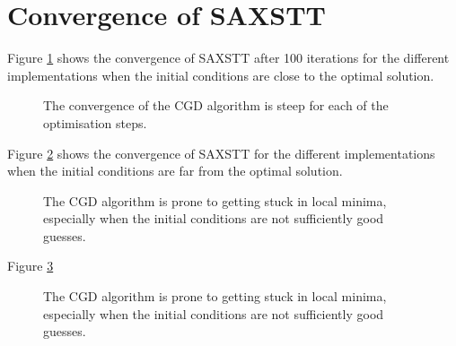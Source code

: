 \section{Convergence of SAXSTT}

Figure \ref{fig:Loss_curve_optimal} shows the convergence of SAXSTT after 100 iterations for the different implementations when the initial conditions are close to the optimal solution. %

\begin{figure}[h!]
    \centering
    \caption{ The convergence of the CGD algorithm is steep for each of the optimisation steps.  }
    \label{fig:Loss_curve_optimal}
\end{figure}

Figure \ref{fig:Loss_curve_worst} shows the convergence of SAXSTT for the different implementations when the initial conditions are far from the optimal solution.

\begin{figure}[h!]
    \centering
    \caption{ The CGD algorithm is prone to getting stuck in local minima, especially when the initial conditions are not sufficiently good guesses.  }
    \label{fig:Loss_curve_worst}
\end{figure}

Figure \ref{fig:Loss_curve_carbon}

\begin{figure}[h!]
    \centering
    \caption{ The CGD algorithm is prone to getting stuck in local minima, especially when the initial conditions are not sufficiently good guesses.  }
    \label{fig:Loss_curve_carbon}
\end{figure}
